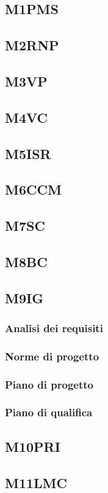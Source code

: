 {{{{{{{{{{{{{\subsection{M1PMS}
\subsection{M2RNP}
\subsection{M3VP}
\subsection{M4VC}
\subsection{M5ISR}
\subsection{M6CCM}
\subsection{M7SC}
\subsection{M8BC}
\subsection{M9IG}
\subsubsection{Analisi dei requisiti}
\subsubsection{Norme di progetto}
\subsubsection{Piano di progetto}
\subsubsection{Piano di qualifica}
\subsection{M10PRI}
\subsection{M11LMC}
}}}}}}}}}}}}}
